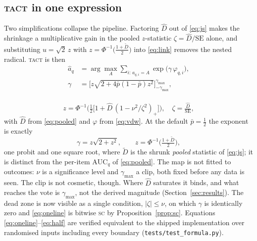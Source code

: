 \documentclass[conference]{IEEEtran}
\newcommand{\Dhat}{\widehat{D}}
\newcommand{\SC}{\textsc{sc}}
\newcommand{\TACT}{\textsc{tact}}
\begin{document}
\subsection{\TACT{} in one expression}\label{sec:oneline}
Two simplifications collapse the pipeline. Factoring $\Dhat$ out of
\eqref{eq:js} makes the shrinkage a multiplicative gain in the pooled
$z$-statistic $\zeta=\Dhat/\mathrm{SE}$ alone, and substituting
$u=\sqrt2\,z$ with $z=\Phi^{-1}\!\big(\tfrac{1+\tilde D}{2}\big)$ into
\eqref{eq:link} removes the nested radical. \TACT{} is then
\hypertarget{eq:oneline}{\,}
\begin{equation}
\boxed{\;
\begin{aligned}
\hat a_q&=\arg\max_A \sum_{i:\,a_{q,i}=A}\exp\big(\gamma\,\varphi_{q,i}\big),\\[2pt]
\gamma&=\Big[z\sqrt{2+4\bar p(1-\bar p)z^{2}}\Big]_{-\gamma_{\max}}^{\gamma_{\max}},
\end{aligned}
\;}
\end{equation}
\hypertarget{eq:oneline2}{\,}
\begin{equation}
z=\Phi^{-1}\!\Big(\tfrac12\big[1+\Dhat\,(1-\nu^{2}/\zeta^{2})_{+}\big]\Big),
\quad \zeta=\tfrac{\Dhat}{\mathrm{SE}},
\end{equation}
with $\Dhat$ from \eqref{eq:pooled} and $\varphi$ from \eqref{eq:vdw}. At the
default $\bar p=\tfrac12$ the exponent is exactly
\hypertarget{eq:half}{\,}
\begin{equation}
\gamma=z\sqrt{2+z^{2}},\qquad z=\Phi^{-1}\!\big(\tfrac{1+\tilde D}{2}\big),
\end{equation}
one probit and one square root, where $\tilde D$ is the shrunk \emph{pooled}
statistic of \eqref{eq:js}; it is distinct from the per-item
$\mathrm{AUC}_q$ of \eqref{eq:pooled}. The map is not fitted to outcomes:
$\nu$ is a
significance level and $\gamma_{\max}$ a clip, both fixed before any data is
seen. The clip is not cosmetic, though. Where $\Dhat$ saturates it binds, and
what reaches the vote is $\gamma_{\max}$, not the derived magnitude
(Section~\ref{sec:results}). The dead zone is now visible as a single condition,
$|\zeta|\le\nu$, on which $\gamma$ is identically zero and \eqref{eq:oneline}
is bitwise \SC{} by Proposition~\ref{prop:sc}. Equations
\eqref{eq:oneline}--\eqref{eq:half} are verified equivalent to the shipped
implementation over randomised inputs including every boundary
(\texttt{tests/test\_formula.py}).
\end{document}
